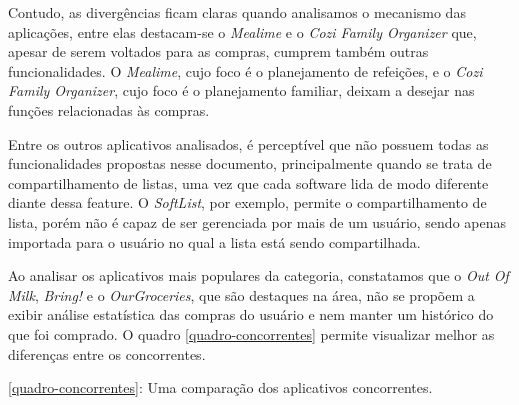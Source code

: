 Contudo, as divergências ficam claras quando analisamos o mecanismo das aplicações, entre elas destacam-se o \textit{Mealime} e o \textit{Cozi Family Organizer} que, apesar de serem voltados para as compras, cumprem também outras funcionalidades. O \textit{Mealime}, cujo foco é o planejamento de refeições, e o \textit{Cozi Family Organizer}, cujo foco é o planejamento familiar, deixam a desejar nas funções relacionadas às compras.

Entre os outros aplicativos analisados, é perceptível que não possuem todas as funcionalidades propostas nesse documento, principalmente quando se trata de compartilhamento de listas, uma vez que cada software lida de modo diferente diante dessa feature. O \textit{SoftList}, por exemplo, permite o compartilhamento de lista, porém não é capaz de ser gerenciada por mais de um usuário, sendo apenas importada para o usuário no qual a lista está sendo compartilhada.

Ao analisar os aplicativos mais populares da categoria, constatamos que o \textit{Out Of Milk}, \textit{Bring!} e o \textit{OurGroceries}, que são destaques na área, não se propõem a exibir análise estatística das compras do usuário e nem manter um histórico do que foi comprado. O quadro \ref{quadro-concorrentes} permite visualizar melhor as diferenças entre os concorrentes.

\label{quadro-concorrentes}
\begin{quadro}[H]
\centering
\caption{\ref{quadro-concorrentes}: Uma comparação dos aplicativos concorrentes.}      
\end{quadro}

